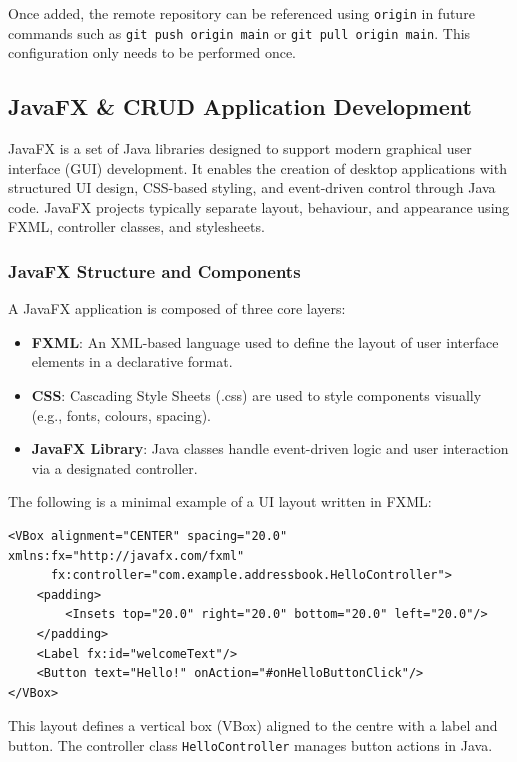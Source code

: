 \documentclass{article}
\newcommand{\codecmd}[1]{\textcolor[rgb]{0,0.5,0}{\texttt{#1}}}
\begin{document}
\noindent Once added, the remote repository can be referenced using \codecmd{origin} in future commands such as \codecmd{git push origin main} or \codecmd{git pull origin main}. This configuration only needs to be performed once.

\subsection{JavaFX \& CRUD Application Development}

JavaFX is a set of Java libraries designed to support modern graphical user interface (GUI) development. It enables the creation of desktop applications with structured UI design, CSS-based styling, and event-driven control through Java code. JavaFX projects typically separate layout, behaviour, and appearance using FXML, controller classes, and stylesheets.

\subsubsection{JavaFX Structure and Components}

A JavaFX application is composed of three core layers:

\begin{itemize}
    \item \textbf{FXML}: An XML-based language used to define the layout of user interface elements in a declarative format.
    \item \textbf{CSS}: Cascading Style Sheets (.css) are used to style components visually (e.g., fonts, colours, spacing).
    \item \textbf{JavaFX Library}: Java classes handle event-driven logic and user interaction via a designated controller.
\end{itemize}

The following is a minimal example of a UI layout written in FXML:

\begin{verbatim}
<VBox alignment="CENTER" spacing="20.0" xmlns:fx="http://javafx.com/fxml"
      fx:controller="com.example.addressbook.HelloController">
    <padding>
        <Insets top="20.0" right="20.0" bottom="20.0" left="20.0"/>
    </padding>
    <Label fx:id="welcomeText"/>
    <Button text="Hello!" onAction="#onHelloButtonClick"/>
</VBox>
\end{verbatim}

This layout defines a vertical box (VBox) aligned to the centre with a label and button. The controller class \codecmd{HelloController} manages button actions in Java.
\end{document}
